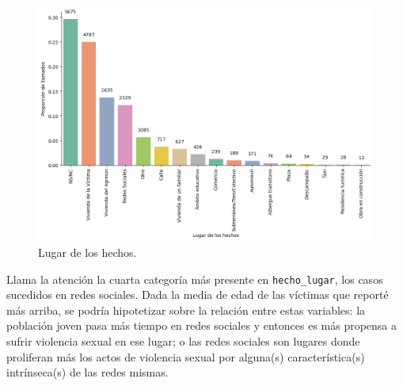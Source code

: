 \documentclass[10 pt]{article}
\begin{document}
\begin{figure}[H]
    \begin{center}
    \includegraphics[scale=.5]{images/latex_lugar_hechos.png}
    \caption{Lugar de los hechos.}
    \label{hecholugar}
    \end{center}
    \end{figure}


Llama la atención la cuarta categoría más presente en \texttt{hecho\_lugar}, los casos sucedidos en redes sociales. Dada la media de edad de las víctimas que reporté más arriba, se podría hipotetizar sobre la relación entre estas variables: la población joven pasa más tiempo en redes sociales y entonces es más propensa a sufrir violencia sexual en ese lugar; o las redes sociales son lugares donde proliferan más los actos de violencia sexual por alguna(s) característica(s) intrínseca(s) de las redes mismas. 

\end{document}
